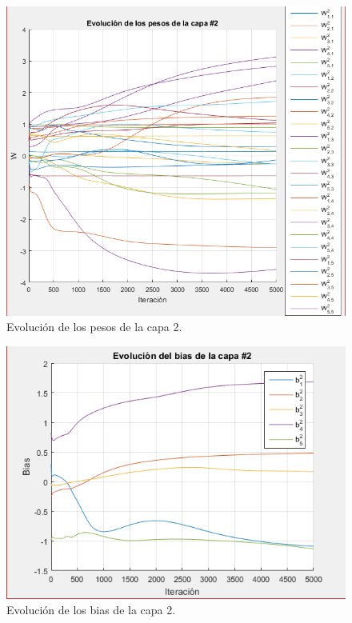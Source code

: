 \begin{figure}[H]
    \begin{center}
        \includegraphics[width=16cm]{3/pesos2.png}
        \caption{Evolución de los pesos de la capa 2.}
        \label{fig:pesos6}
    \end{center}
\end{figure}

\begin{figure}[H]
    \begin{center}
        \includegraphics[width=12cm]{3/bias2.png}
        \caption{Evolución de los bias de la capa 2.}
        \label{fig:bias6}
    \end{center}
\end{figure}

